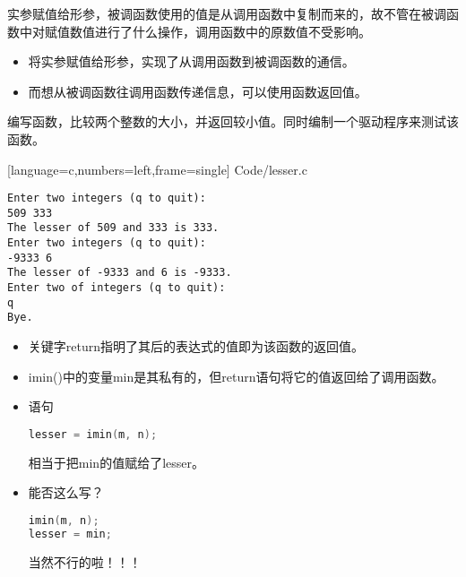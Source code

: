 \begin{frame}[fragile]
实参赋值给形参，被调函数使用的值是从调用函数中复制而来的，故不管在被调函数中对赋值数值进行了什么操作，调用函数中的原数值不受影响。
\end{frame}

\begin{frame}[fragile]
\begin{itemize}
\item
将实参赋值给形参，实现了从调用函数到被调函数的通信。\\[0.1in]
\item
而想从被调函数往调用函数传递信息，可以使用函数返回值。
\end{itemize}

\end{frame}

\begin{frame}[fragile]
  \begin{wenti}
    编写函数，比较两个整数的大小，并返回较小值。同时编制一个驱动程序来测试该函数。
  \end{wenti}
\end{frame}

\begin{frame}

[language=c,numbers=left,frame=single]
{Code/lesser.c}
\end{frame}

\begin{frame}[fragile]

\begin{lstlisting}[backgroundcolor=\color{red!10}]
Enter two integers (q to quit):
509 333
The lesser of 509 and 333 is 333.
Enter two integers (q to quit):
-9333 6
The lesser of -9333 and 6 is -9333.
Enter two of integers (q to quit):
q
Bye.
\end{lstlisting}
\end{frame}

\begin{frame}[fragile]
\begin{itemize}
\item
关键字{\tf return}指明了其后的表达式的值即为该函数的返回值。\\[0.1in]
\item 
{\tf imin()}中的变量{\tf min}是其私有的，但{\tf return}语句将它的值返回给了调用函数。\\[0.1in]
\item 
语句
\begin{lstlisting}[language=c,backgroundcolor=\color{red!10}]
lesser = imin(m, n);
\end{lstlisting}
相当于把min的值赋给了lesser。
\\[0.1in]
\item
能否这么写？
\begin{lstlisting}[language=c,backgroundcolor=\color{red!10}]
imin(m, n);
lesser = min;
\end{lstlisting} \pause
{\Huge 当然不行的啦！！！}
\end{itemize}
\end{frame}

